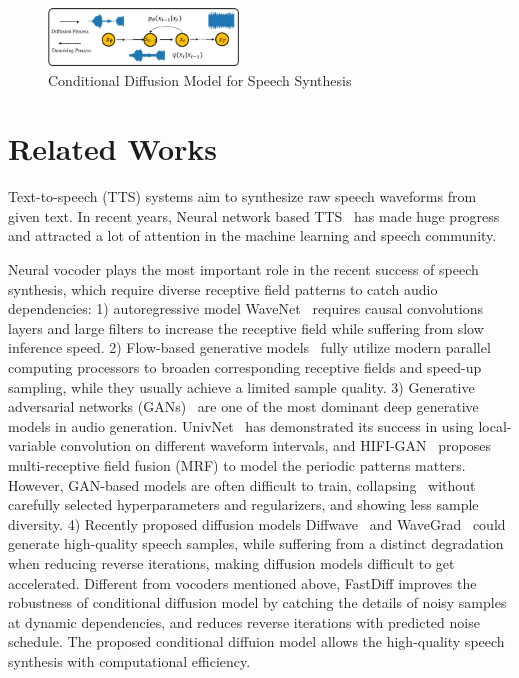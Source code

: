 \begin{figure}
    \centering
    \includegraphics[width=0.45\textwidth]{Figures/process.pdf}
   \caption{Conditional Diffusion Model for Speech Synthesis} 
    \label{fig:process}
  \end{figure}

\section{Related Works}

Text-to-speech (TTS) systems aim to synthesize raw speech waveforms from given text. In recent years, Neural network based TTS~\cite{ren2020fastspeech,kim2020glow,liu2021diffsinger} has made huge progress and attracted a lot of attention in the machine learning and speech community.

Neural vocoder plays the most important role in the recent success of speech synthesis, which require diverse receptive field patterns to catch audio dependencies: 1) autoregressive model WaveNet~\cite{oord2016wavenet} requires causal convolutions layers and large filters to increase the receptive field while suffering from slow inference speed. 2) Flow-based generative models~\cite{prenger2019waveglow} fully utilize modern parallel computing processors to broaden corresponding receptive fields and speed-up sampling, while they usually achieve a limited sample quality. 3) Generative adversarial networks (GANs)~\cite{jang2021univnet,kong2020hifi} are one of the most dominant deep generative models in audio generation. UnivNet~\cite{jang2021univnet} has demonstrated its success in using local-variable convolution on different waveform intervals, and HIFI-GAN~\cite{kong2020hifi} proposes multi-receptive field fusion (MRF) to model the periodic patterns matters. However, GAN-based models are often difficult to train, collapsing~\cite{creswell2018generative} without carefully selected hyperparameters and regularizers, and showing less sample diversity. 4) Recently proposed diffusion models Diffwave~\cite{kong2020diffwave} and WaveGrad~\cite{chen2020wavegrad} could generate high-quality speech samples, while suffering from a distinct degradation when reducing reverse iterations, making diffusion models difficult to get accelerated. Different from vocoders mentioned above, FastDiff improves the robustness of conditional diffusion model by catching the details of noisy samples at dynamic dependencies, and reduces reverse iterations with predicted noise schedule. The proposed conditional diffuion model allows the high-quality speech synthesis with computational efficiency. 

